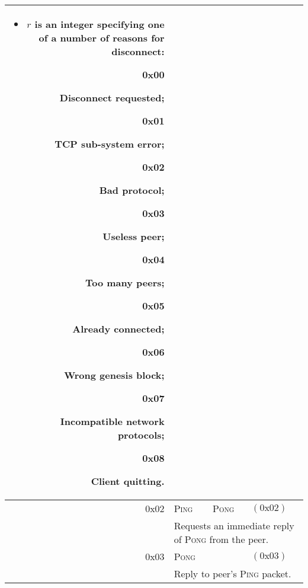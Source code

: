 \documentclass[9pt,oneside]{amsart}
\begin{document}
\begin{tabular*}{\columnwidth}[h]{rlll}
{\begin{itemize}
\item $r$ is an integer specifying one of a number of reasons for disconnect:
\begin{description}
\item[0x00] Disconnect requested;
\item[0x01] TCP sub-system error;
\item[0x02] Bad protocol;
\item[0x03] Useless peer;
\item[0x04] Too many peers;
\item[0x05] Already connected;
\item[0x06] Wrong genesis block;
\item[0x07] Incompatible network protocols;
\item[0x08] Client quitting.
\end{description}
\end{itemize}
}\\
\midrule
0x02 & \textsc{Ping} & \textsc{Pong} & $(\text{0x}02)$ \\
& \multicolumn{3}{p{0.8\columnwidth}}{Requests an immediate reply of \textsc{Pong} from the peer.}\\
\midrule
0x03 & \textsc{Pong} && $(\text{0x}03)$ \\
& \multicolumn{3}{p{0.8\columnwidth}}{Reply to peer's \textsc{Ping} packet.}\\
\bottomrule
\end{tabular*}
\end{document}
